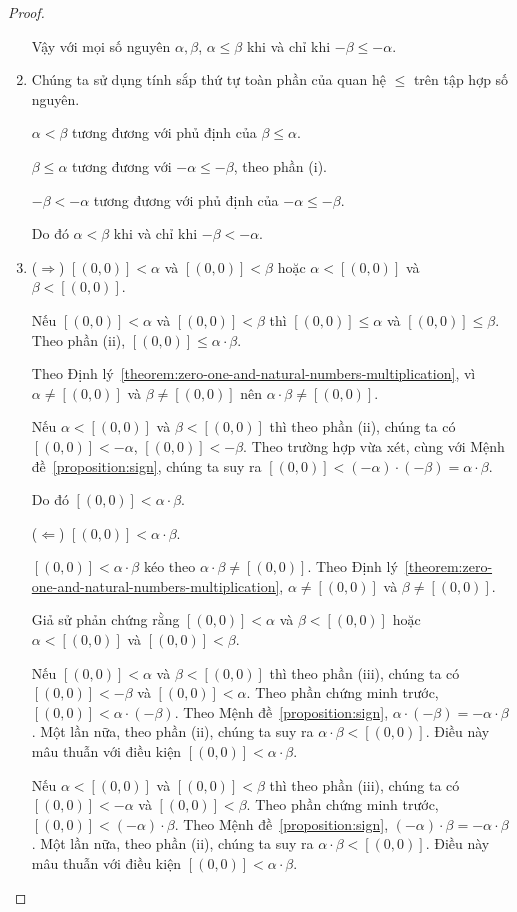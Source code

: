 \begin{proof}
\begin{enumerate}[label={(\roman*)}]
		      Vậy với mọi số nguyên $\alpha, \beta$, $\alpha\leq \beta$ khi và chỉ khi $-\beta\leq-\alpha$.
		\item Chúng ta sử dụng tính sắp thứ tự toàn phần của quan hệ $\leq$ trên tập hợp số nguyên.

		      $\alpha < \beta$ tương đương với phủ định của $\beta\leq\alpha$.

		      $\beta\leq\alpha$ tương đương với $-\alpha\leq-\beta$, theo phần (i).

		      $-\beta < -\alpha$ tương đương với phủ định của $-\alpha\leq-\beta$.

		      Do đó $\alpha < \beta$ khi và chỉ khi $-\beta < -\alpha$.
		\item ($\Rightarrow$) $[(0,0)] < \alpha$ và $[(0,0)] < \beta$ hoặc $\alpha < [(0,0)]$ và $\beta < [(0,0)]$.

		      Nếu $[(0,0)] < \alpha$ và $[(0,0)] < \beta$ thì $[(0,0)]\leq \alpha$ và $[(0,0)]\leq \beta$. Theo phần (ii), $[(0,0)] \leq \alpha\cdot\beta$.

		      Theo Định lý~\ref{theorem:zero-one-and-natural-numbers-multiplication}, vì $\alpha\ne [(0,0)]$ và $\beta\ne[(0,0)]$ nên $\alpha\cdot\beta \ne [(0,0)]$.

		      Nếu $\alpha < [(0,0)]$ và $\beta < [(0,0)]$ thì theo phần (ii), chúng ta có $[(0,0)] < -\alpha$, $[(0,0)] < -\beta$. Theo trường hợp vừa xét, cùng với Mệnh đề~\ref{proposition:sign}, chúng ta suy ra $[(0, 0)] < (-\alpha)\cdot(-\beta) = \alpha\cdot\beta$.

		      Do đó $[(0,0)] < \alpha\cdot\beta$.

		      ($\Leftarrow$) $[(0,0)] < \alpha\cdot\beta$.

		      $[(0,0)] < \alpha\cdot\beta$ kéo theo $\alpha\cdot\beta \ne [(0,0)]$. Theo Định lý~\ref{theorem:zero-one-and-natural-numbers-multiplication}, $\alpha\ne [(0,0)]$ và $\beta\ne [(0,0)]$.

		      Giả sử phản chứng rằng $[(0,0)] < \alpha$ và $\beta < [(0,0)]$ hoặc $\alpha < [(0,0)]$ và $[(0,0)] < \beta$.

		      Nếu $[(0,0)] < \alpha$ và $\beta < [(0,0)]$ thì theo phần (iii), chúng ta có $[(0,0)] < -\beta$ và $[(0,0)] < \alpha$. Theo phần chứng minh trước, $[(0,0)] < \alpha\cdot(-\beta)$. Theo Mệnh đề~\ref{proposition:sign}, $\alpha\cdot(-\beta) = -\alpha\cdot\beta$. Một lần nữa, theo phần (ii), chúng ta suy ra $\alpha\cdot\beta < [(0,0)]$. Điều này mâu thuẫn với điều kiện $[(0,0)] < \alpha\cdot\beta$.

		      Nếu $\alpha < [(0,0)]$ và $[(0,0)] < \beta$ thì theo phần (iii), chúng ta có $[(0,0)] < -\alpha$ và $[(0,0)] < \beta$. Theo phần chứng minh trước, $[(0,0)] < (-\alpha)\cdot\beta$. Theo Mệnh đề~\ref{proposition:sign}, $(-\alpha)\cdot\beta = -\alpha\cdot\beta$. Một lần nữa, theo phần (ii), chúng ta suy ra $\alpha\cdot\beta < [(0,0)]$. Điều này mâu thuẫn với điều kiện $[(0,0)] < \alpha\cdot\beta$.


\end{enumerate}
\end{proof}
